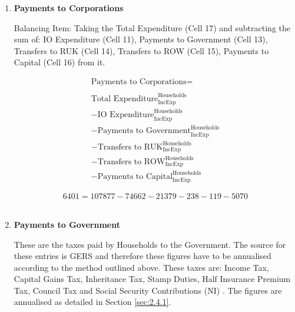 \begin{enumerate}
\item \textbf {Payments to Corporations}

Balancing Item: Taking the Total Expenditure (Cell 17) and subtracting the sum of: IO Expenditure (Cell 11), Payments to Government (Cell 13), Transfers to RUK (Cell 14), Transfers to ROW (Cell 15), Payments to Capital (Cell 16) from it.

\begin{equation}
\begin{split}
\text{Payments to Corporations} =  \\ \\
\text{Total Expenditure}^\text{Households}_\text{IncExp}\\
-\text{IO Expenditure}^\text{Households}_\text{IncExp}\\
-\text{Payments to Government}^\text{Households}_\text{IncExp}\\
-\text{Transfers to RUK}^\text{Households}_\text{IncExp}\\
-\text{Transfers to ROW}^\text{Households}_\text{IncExp}\\
-\text{Payments to Capital}^\text{Households}_\text{IncExp}
\end{split} \label{eq:2.5.16}
\end{equation}

\begin{equation} \nonumber
6401 = 107877-74662-21379-238-119-5070
\end{equation}\\


\item \textbf {Payments to Government}

These are the taxes paid by Households to the Government. The source for these entries is GERS and therefore these figures have to be annualised according to the method outlined above. These taxes are: Income Tax, Capital Gains Tax, Inheritance Tax, Stamp Duties, Half Insurance Premium Tax, Council Tax and Social Security Contributions (NI) \cite{ScotGov2013b}. The figures are annualised as detailed in Section \ref{sec:2.4.1}.


\end{enumerate}
